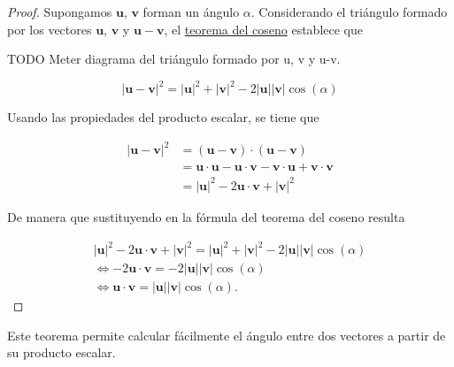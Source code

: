 \documentclass[
  a4paper,
]{scrreport}
\theoremstyle{definition}
\theoremstyle{plain}
\theoremstyle{definition}
\theoremstyle{definition}
\theoremstyle{plain}
\theoremstyle{plain}
\theoremstyle{remark}
\begin{document}
\begin{tcolorbox}[enhanced jigsaw, leftrule=.75mm, colbacktitle=quarto-callout-note-color!10!white, toprule=.15mm, opacityback=0, opacitybacktitle=0.6, toptitle=1mm, breakable, bottomtitle=1mm, colframe=quarto-callout-note-color-frame, rightrule=.15mm, titlerule=0mm, title=\textcolor{quarto-callout-note-color}{\faInfo}\hspace{0.5em}{Demostración}, arc=.35mm, left=2mm, bottomrule=.15mm, colback=white, coltitle=black]

\begin{proof}
Supongamos \(\mathbf{u}\), \(\mathbf{v}\) forman un ángulo \(\alpha\).
Considerando el triángulo formado por los vectores \(\mathbf{u}\),
\(\mathbf{v}\) y \(\mathbf{u-v}\), el
\href{https://es.wikipedia.org/wiki/Teorema_del_coseno}{teorema del
coseno} establece que

TODO Meter diagrama del triángulo formado por u, v y u-v.

\[
|\mathbf{u}-\mathbf{v}|^2 = |\mathbf{u}|^2 + |\mathbf{v}|^2 - 2|\mathbf{u}||\mathbf{v}|\cos(\alpha)
\]

Usando las propiedades del producto escalar, se tiene que

\begin{align*}
|\mathbf{u}-\mathbf{v}|^2 
&= (\mathbf{u}-\mathbf{v})\cdot (\mathbf{u}-\mathbf{v}) \\
&= \mathbf{u}\cdot \mathbf{u} - \mathbf{u}\cdot \mathbf{v} - \mathbf{v}\cdot \mathbf{u} + \mathbf{v}\cdot \mathbf{v} \\
&= |\mathbf{u}|^2 - 2 \mathbf{u}\cdot \mathbf{v} + |\mathbf{v}|^2
\end{align*}

De manera que sustituyendo en la fórmula del teorema del coseno resulta

\[
\begin{gathered}
|\mathbf{u}|^2 - 2 \mathbf{u}\cdot \mathbf{v} + |\mathbf{v}|^2 = |\mathbf{u}|^2 + |\mathbf{v}|^2 - 2|\mathbf{u}||\mathbf{v}|\cos(\alpha) \\
\Leftrightarrow - 2 \mathbf{u}\cdot \mathbf{v} = - 2|\mathbf{u}||\mathbf{v}|\cos(\alpha) \\
\Leftrightarrow \mathbf{u}\cdot \mathbf{v} = |\mathbf{u}||\mathbf{v}|\cos(\alpha).
\end{gathered}
\]
\end{proof}

\end{tcolorbox}

Este teorema permite calcular fácilmente el ángulo entre dos vectores a
partir de su producto escalar.
\end{document}
